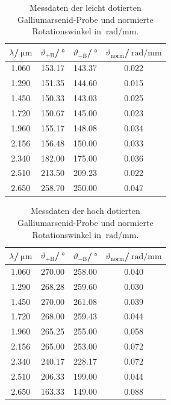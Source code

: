 \begin{table}[h!]
  \centering
  \caption{Messdaten der leicht dotierten Galliumarsenid-Probe und normierte Rotationswinkel in $\SI{}{\radian\per\milli\meter}$.}
  \label{tab:tief}
  \begin{tabular}{c | c | c | c}
    \toprule
    $\lambda$/$\SI{}{\micro\meter}$ & $\vartheta_\mathrm{+B}$/$\SI{}{\degree}$ & $\vartheta_\mathrm{-B}$/$\SI{}{\degree}$& $\vartheta_{\mathrm{norm}}$/$\SI{}{\radian\per\milli\meter}$ \\
    \midrule
    1.060 & 153.17 & 143.37 & 0.022 \\
    1.290 & 151.35 & 144.60 & 0.015 \\
    1.450 & 150.33 & 143.03 & 0.025 \\
    1.720 & 150.67 & 145.00 & 0.023 \\
    1.960 & 155.17 & 148.08 & 0.034 \\
    2.156 & 156.48 & 150.00 & 0.033 \\
    2.340 & 182.00 & 175.00 & 0.036 \\
    2.510 & 213.50 & 209.23 & 0.022 \\
    2.650 & 258.70 & 250.00 & 0.047 \\
    \bottomrule
  \end{tabular}
\end{table}

\begin{table}[h!]
  \centering
  \caption{Messdaten der hoch dotierten Galliumarsenid-Probe und normierte Rotationswinkel in $\SI{}{\radian\per\milli\meter}$.}
  \label{tab:hoch}
  \begin{tabular}{c | c | c | c}
    \toprule
    $\lambda$/$\SI{}{\micro\meter}$ & $\vartheta_\mathrm{+B}$/$\SI{}{\degree}$ & $\vartheta_\mathrm{-B}$/$\SI{}{\degree}$& $\vartheta_{\mathrm{norm}}$/$\SI{}{\radian\per\milli\meter}$ \\
    \midrule
    1.060 & 270.00 & 258.00 & 0.040 \\
    1.290 & 268.28 & 259.60 & 0.030 \\
    1.450 & 270.00 & 261.08 & 0.039 \\
    1.720 & 268.00 & 259.43 & 0.044 \\
    1.960 & 265.25 & 255.00 & 0.058 \\
    2.156 & 265.00 & 253.00 & 0.072 \\
    2.340 & 240.17 & 228.17 & 0.072 \\
    2.510 & 206.33 & 199.00 & 0.044 \\
    2.650 & 163.33 & 149.00 & 0.088 \\
    \bottomrule
  \end{tabular}
\end{table}

